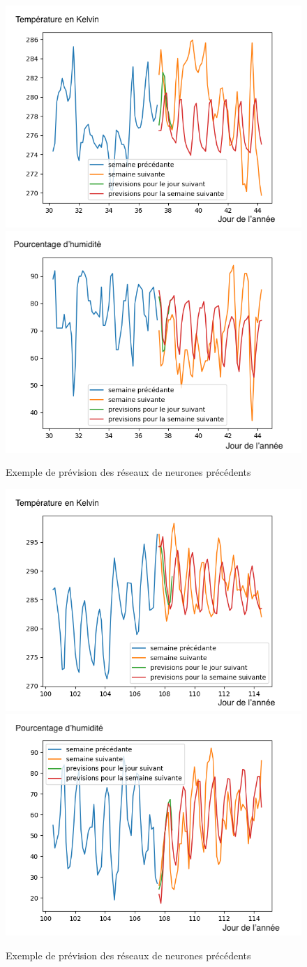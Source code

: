 \documentclass[11pt,a4paper]{article}
\begin{document}
\begin{figure} [H]
\centering
\includegraphics[width=0.48 \textwidth]{./imagesTIPE/imagesIA/dessinTempIA30,25.png}\quad
\includegraphics[width=0.48 \textwidth]{./imagesTIPE/imagesIA/dessinHumiIA30,25.png}
\caption{\label{fig:cosDS} Exemple de prévision des réseaux de neurones précédents}
\end{figure}
\begin{figure} [H]
\centering
\includegraphics[width=0.48 \textwidth]{./imagesTIPE/imagesIA/dessinTempIA100,5.png}\quad
\includegraphics[width=0.48 \textwidth]{./imagesTIPE/imagesIA/dessinHumiIA100,5.png}
\caption{\label{fig:cosDS} Exemple de prévision des réseaux de neurones précédents}
\end{figure}
\end{document}
